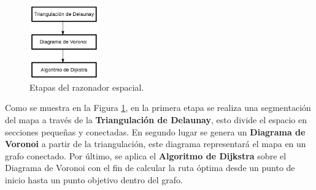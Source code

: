 \documentclass[11pt,twoside,A5]{article}
\newcommand{\reffigure}[1]{Figura \ref{#1}}
\begin{document}
\begin{figure}[H]
\begin{center}
\includegraphics[width=3cm]{razonador-espacial.png} 
\caption{Etapas del razonador espacial.}
\label{fig:razonador-espacial}
\end{center}
\end{figure}

Como se muestra en la \reffigure{fig:razonador-espacial}, en la primera etapa se realiza una segmentación del mapa
a través de la \textbf{Triangulación de Delaunay}, esto divide el espacio en secciones pequeñas y conectadas. En segundo lugar
se genera un \textbf{Diagrama de Voronoi} a partir de la triangulación, este diagrama representará el mapa
en un grafo conectado. Por último, se aplica el \textbf{Algoritmo de Dijkstra} sobre el Diagrama de Voronoi con el fin
de calcular la ruta óptima desde un punto de inicio hasta un punto objetivo dentro del grafo.
\end{document}
